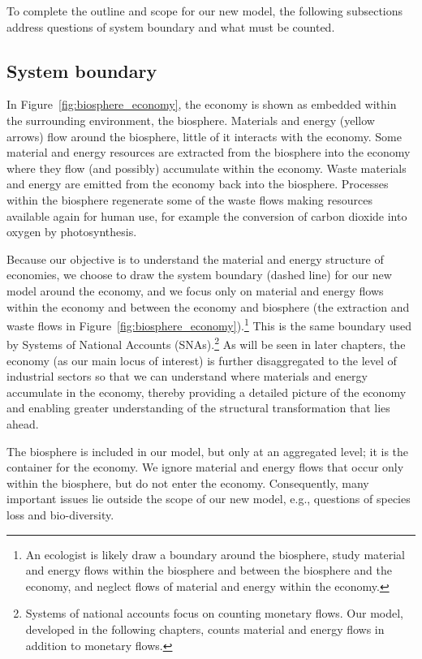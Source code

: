 To complete the outline and scope for our new model, 
the following subsections address
questions of system boundary and what must be counted.


\subsection{System boundary}
\label{sec:system_boundary}

In Figure~\ref{fig:biosphere_economy},
the economy is shown as embedded within the surrounding environment,
the biosphere.
Materials and energy (yellow arrows) flow around the biosphere,
little of it interacts with the economy.
Some material and energy resources are extracted from the biosphere 
into the economy where they 
flow (and possibly) accumulate within the economy.
Waste materials and energy are emitted from the economy back into the biosphere.
Processes within the biosphere regenerate some of the waste
flows making resources available again for human use,
for example the conversion of carbon dioxide into oxygen by photosynthesis.

Because our objective is to understand the material and energy structure of economies,
we choose to draw the system boundary (dashed line) for our new model 
around the economy, 
and we focus only on material and energy flows within the economy
and between the economy and biosphere (the extraction and waste flows 
in Figure~\ref{fig:biosphere_economy}).\footnote{An ecologist
	is likely draw a boundary around the biosphere, 
	study material and energy flows within the biosphere
	and between the biosphere and the economy, and 
	neglect flows of material and energy within the economy.
	}
This is the same boundary used by
Systems of National Accounts (SNAs).\footnote{Systems of national accounts
	focus on counting monetary flows.
	Our model, developed in the following chapters,
	counts material and energy flows in addition to monetary flows.
	}
As will be seen in later chapters,
the economy (as our main locus of interest) is further disaggregated 
to the level of industrial sectors
so that we can understand 
where materials and energy accumulate in the economy, thereby providing
a detailed picture of the economy and
enabling greater understanding of the structural transformation that lies ahead.

The biosphere is included in our model, but only at an aggregated level;
it is the container for the economy. 
We ignore material and energy flows that occur only within the biosphere,
but do not enter the economy.
Consequently, many important issues lie outside the scope of our new model, 
e.g., questions of species loss and
bio-diversity.

